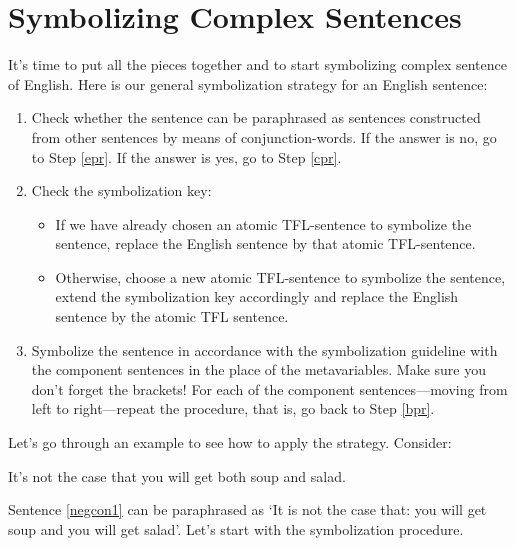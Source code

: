 \section{Symbolizing Complex Sentences}\label{s:SymbolisingComplexTFL}
It's time to put all the pieces together and to start symbolizing complex sentence of English. Here is our general symbolization strategy for an English sentence:
\begin{highlighted}
\begin{enumerate}
\item\label{bpr} Check whether the sentence can be paraphrased as sentences constructed from other sentences by means of conjunction-words. If the answer is no, go to Step \ref{epr}. If the answer is yes, go to Step \ref{cpr}.
\item\label{epr} Check the symbolization key:
\begin{itemize}
\item If we have already chosen an atomic TFL-sentence to symbolize the sentence, replace the English sentence by that atomic TFL-sentence.
\item Otherwise, choose a new atomic TFL-sentence to symbolize the sentence, extend the symbolization key accordingly and replace the English sentence by the atomic TFL sentence.
\end{itemize}
\item\label{cpr} Symbolize the sentence in accordance with the symbolization guideline with the component sentences in the place of the metavariables. Make sure you don't forget the brackets! For each of the component sentences---moving from left to right---repeat the procedure, that is, go back to Step \ref{bpr}.
\end{enumerate}
\end{highlighted}

Let's go through an example to see how to apply the strategy. Consider:
	\begin{earg}
		\item[\ex{negcon1}] It's not the case that you will get both soup and salad.
	\end{earg}
Sentence \ref{negcon1} can be paraphrased as `It is not the case that: you will get soup and you will get salad'. Let's start with the symbolization procedure.

